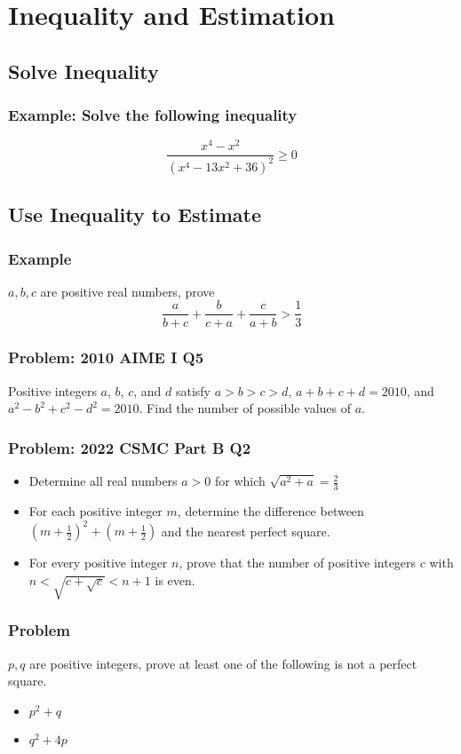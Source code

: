 \documentclass{article}
\begin{document}
\section{Inequality and Estimation}

\subsection{Solve Inequality}

\subsubsection{Example: Solve the following inequality}
$$\frac{x^4-x^2}{(x^4-13x^2+36)^2} \ge 0$$
\vspace{60px}

\subsection{Use Inequality to Estimate}
\subsubsection{Example}
$a,b,c$ are positive real numbers, prove
$$\frac{a}{b+c}+\frac{b}{c+a}+\frac{c}{a+b} > \frac{1}{3}$$
\vspace{60px}

\subsubsection{Problem: 2010 AIME I Q5}
Positive integers $a$, $b$, $c$, and $d$ satisfy $a > b > c > d$, $a + b + c + d = 2010$, and $a^2 - b^2 + c^2 - d^2 = 2010$. Find the number of possible values of $a$.
\vspace{60px}

\pagebreak

\subsubsection{Problem: 2022 CSMC Part B Q2}

\begin{itemize}
    \item  Determine all real numbers $a > 0$ for which $\sqrt{a^2+a}=\frac{2}{3}$
    \item  For each positive integer $m$, determine the difference between $(m+\frac{1}{2})^2+(m+\frac{1}{2})$ and the nearest perfect square.
    \item  For every positive integer $n$, prove that the number of positive integers $c$ with $n<\sqrt{c+\sqrt{c}}<n+1$ is even.
\end{itemize}

\pagebreak
\subsubsection{Problem}
$p, q$ are positive integers, prove at least one of the following is not a perfect square.
\begin{itemize}
    \item $p^2+q$
    \item $q^2+4p$
\end{itemize}
\end{document}
